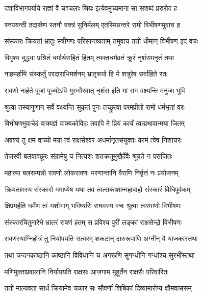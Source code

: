 \twolineshloka
{दशाविभागपर्याये राज्ञां वै चञ्चलाः श्रियः}
{इत्येवमुच्यमाना सा सशब्दं प्ररुरोद ह} %

\twolineshloka
{स्नपयन्ती तदास्रेण स्तनौ वक्त्रं सुनिर्मलम्}
{एतस्मिन्नन्तरे रामो विभीषणमुवाच ह} %

\twolineshloka
{संस्कारः क्रियतां भ्रातुः स्त्रीगणः परिसान्त्व्यताम्}
{तमुवाच ततो धीमान् विभीषण इदं वचः} %

\twolineshloka
{विमृश्य बुद्ध्या प्रश्रितं धर्मार्थसहितं हितम्}
{त्यक्तधर्मव्रतं क्रूरं नृशंसमनृतं तथा} %

\twolineshloka
{नाहमर्हामि संस्कर्तुं परदाराभिमर्शनम्}
{भ्रातृरूपो हि मे शत्रुरेष सर्वाहिते रतः} %

\twolineshloka
{रावणो नार्हते पूजां पूज्योऽपि गुरुगौरवात्}
{नृशंस इति मां राम वक्ष्यन्ति मनुजा भुवि} %

\twolineshloka
{श्रुत्वा तस्यागुणान् सर्वे वक्ष्यन्ति सुकृतं पुनः}
{तच्छ्रुत्वा परमप्रीतो रामो धर्मभृतां वरः} %

\twolineshloka
{विभीषणमुवाचेदं वाक्यज्ञं वाक्यकोविदः}
{तवापि मे प्रियं कार्यं त्वत्प्रभावान्मया जितम्} %

\twolineshloka
{अवश्यं तु क्षमं वाच्यो मया त्वं राक्षसेश्वर}
{अधर्मानृतसंयुक्तः कामं त्वेष निशाचरः} %

\twolineshloka
{तेजस्वी बलवाञ्छूरः संग्रामेषु च नित्यशः}
{शतक्रतुमुखैर्देवैः श्रूयते न पराजितः} %

\twolineshloka
{महात्मा बलसम्पन्नो रावणो लोकरावणः}
{मरणान्तानि वैराणि निर्वृत्तं नः प्रयोजनम्} %

\twolineshloka
{क्रियतामस्य संस्कारो ममाप्येष यथा तव}
{त्वत्सकाशान्महाबाहो संस्कारं विधिपूर्वकम्} %

\twolineshloka
{क्षिप्रमर्हति धर्मेण त्वं यशोभाग् भविष्यसि}
{राघवस्य वचः श्रुत्वा त्वरमाणो विभीषणः} %

\twolineshloka
{संस्कारयितुमारेभे भ्रातरं रावणं हतम्}
{स प्रविश्य पुरीं लङ्कां राक्षसेन्द्रो विभीषणः} %

\twolineshloka
{रावणस्याग्निहोत्रं तु निर्यापयति सत्वरम्}
{शकटान् दारुरूपाणि अग्नीन् वै याजकांस्तथा} %

\twolineshloka
{तथा चन्दनकाष्ठानि काष्ठानि विविधानि च}
{अगरूणि सुगन्धीनि गन्धांश्च सुरभींस्तथा} %

\twolineshloka
{मणिमुक्ताप्रवालानि निर्यापयति राक्षसः}
{आजगाम मुहूर्तेन राक्षसैः परिवारितः} %

\twolineshloka
{ततो माल्यवता सार्धं क्रियामेव चकार सः}
{सौवर्णीं शिबिकां दिव्यामारोप्य क्षौमवाससम्} %

